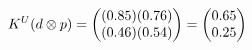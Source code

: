 \documentclass[preview]{standalone}
\begin{document}
\begin{align*}
\special{dvisvgm:raw <g id='unique000'>}K^U(d \otimes p) = \begin{pmatrix} (0.85)(0.76) \\ (0.46)(0.54) \end{pmatrix} = \begin{pmatrix} 0.65 \\ 0.25 \end{pmatrix}\special{dvisvgm:raw </g>}
\end{align*}
\end{document}

